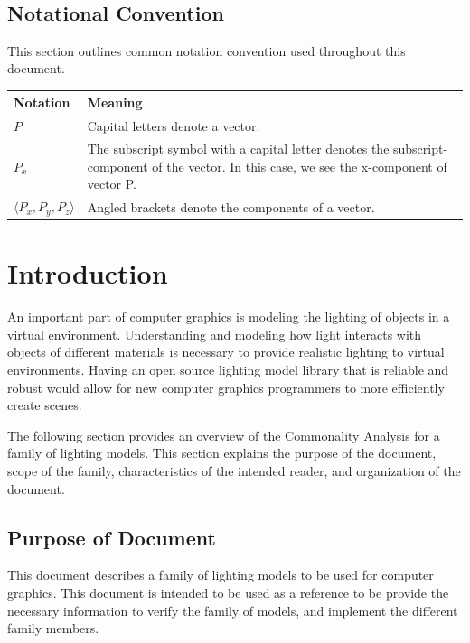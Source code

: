 \documentclass[12pt]{article}
\begin{document}

\newpage

\tableofcontents

~\newpage


\subsection{Notational Convention}
This section outlines common notation convention used throughout this document.

\begin{table}
	\begin{tabular}{|l|l|}
		\hline
		\textbf{Notation} & \textbf{Meaning} \\
		\hline
		$P$ & Capital letters denote a vector. \\
		\hline
		$P_{x}$ & The subscript symbol with a capital letter denotes the 
		subscript-component of the vector. In this case, we see the x-component 
		of vector P. \\
		\hline		
		$\langle P_{x}, P_{y}, P_{z} \rangle$ & Angled brackets denote the 
		components of a vector. \\
		\hline
		\hline
	\end{tabular}
\end{table}

\section{Introduction}
An important part of computer graphics is modeling the lighting 
of objects in a virtual environment. Understanding and modeling how light 
interacts with objects of different materials is necessary to provide realistic 
lighting to virtual environments. Having an open source lighting model library 
that is reliable and robust would allow for new computer graphics programmers 
to more efficiently create scenes.

The following section provides an overview of the Commonality Analysis for a 
family of lighting models. This section explains the purpose of the document, 
scope of the family, characteristics of the intended reader, and organization 
of the document.

\subsection{Purpose of Document}
This document describes a family of lighting models to be used for computer 
graphics. This document is intended to be used as a reference to be provide the 
necessary information to verify the family of models, and implement the 
different family members. 
\end{document}
